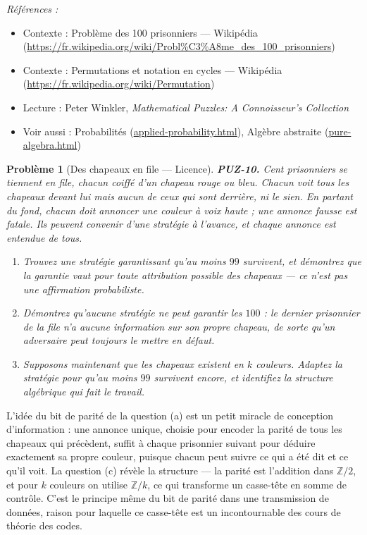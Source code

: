 \documentclass[11pt]{article}
\newtheorem{problem}{Problème}
\newenvironment{refs}{\par\small\noindent\emph{Références :}\begin{itemize}\setlength\itemsep{0pt}}{\end{itemize}\normalsize}
\begin{document}
\begin{refs}
\item Contexte : Problème des 100 prisonniers --- Wikipédia (\url{https://fr.wikipedia.org/wiki/Probl%C3%A8me_des_100_prisonniers})
\item Contexte : Permutations et notation en cycles --- Wikipédia (\url{https://fr.wikipedia.org/wiki/Permutation})
\item Lecture : Peter Winkler, \textit{Mathematical Puzzles: A Connoisseur's Collection}
\item Voir aussi : Probabilités (\url{applied-probability.html}), Algèbre abstraite (\url{pure-algebra.html})
\end{refs}

\bigskip

\begin{problem}[{Des chapeaux en file --- Licence}]
\textbf{PUZ-10.} Cent prisonniers se tiennent en file, chacun coiffé d'un chapeau rouge
ou bleu. Chacun voit tous les chapeaux devant lui mais aucun de ceux qui sont derrière, ni
le sien. En partant du fond, chacun doit annoncer une couleur à voix haute ; une annonce
fausse est fatale. Ils peuvent convenir d'une stratégie à l'avance, et chaque annonce est
entendue de tous.
\begin{enumerate}
\item[(a)] Trouvez une stratégie garantissant qu'au moins $ 99 $ survivent, et démontrez que la
garantie vaut pour toute attribution possible des chapeaux --- ce n'est pas une affirmation
probabiliste.
\item[(b)] Démontrez qu'aucune stratégie ne peut garantir les $ 100 $ : le dernier prisonnier de
la file n'a aucune information sur son propre chapeau, de sorte qu'un adversaire peut
toujours le mettre en défaut.
\item[(c)] Supposons maintenant que les chapeaux existent en $ k $ couleurs. Adaptez la stratégie
pour qu'au moins $ 99 $ survivent encore, et identifiez la structure algébrique qui fait
le travail.
\end{enumerate}

\end{problem}

\noindent L'idée du bit de parité de la question (a) est un petit miracle de
conception d'information : une annonce unique, choisie pour encoder la parité de tous les
chapeaux qui précèdent, suffit à chaque prisonnier suivant pour déduire exactement sa propre
couleur, puisque chacun peut suivre ce qui a été dit et ce qu'il voit. La question (c)
révèle la structure --- la parité est l'addition dans $ \mathbb{Z}/2 $, et pour $ k $
couleurs on utilise $ \mathbb{Z}/k $, ce qui transforme un casse-tête en somme de
contrôle. C'est le principe même du bit de parité dans une transmission de données, raison
pour laquelle ce casse-tête est un incontournable des cours de théorie des codes.
\end{document}

